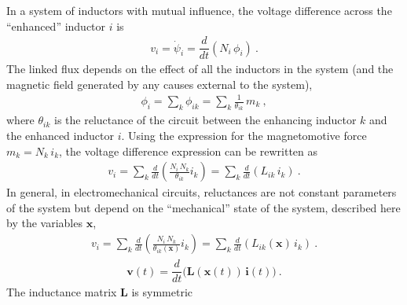 \documentclass[letterpaper,10pt,english]{jupyterBook}
\begin{document}
\sphinxAtStartPar
In a system of inductors with mutual influence, the voltage difference across the “enhanced” inductor \(i\) is
\begin{equation*}
\begin{split}v_i = \dot{\psi}_i = \dfrac{d}{dt} \left( N_i \, \phi_i \right) \ .\end{split}
\end{equation*}
\sphinxAtStartPar
The linked flux depends on the effect of all the inductors in the system (and the magnetic field generated by any causes external to the system),
\begin{equation*}
\begin{split}\phi_i = \sum_{k} \phi_{ik} = \sum_{k} \frac{1}{\theta_{ik}} \, m_k \ ,\end{split}
\end{equation*}
\sphinxAtStartPar
where \(\theta_{ik}\) is the reluctance of the circuit between the enhancing inductor \(k\) and the enhanced inductor \(i\). Using the expression for the magnetomotive force \(m_k = N_k \, i_k\), the voltage difference expression can be rewritten as
\begin{equation*}
\begin{split}v_i = \sum_k \frac{d}{dt} \left( \frac{N_i \, N_k}{\theta_{ik}} i_k \right) = \sum_k \frac{d}{dt} \left( L_{ik} \, i_k \right) \ .\end{split}
\end{equation*}
\sphinxAtStartPar
In general, in electromechanical circuits, reluctances are not constant parameters of the system but depend on the “mechanical” state of the system, described here by the variables \(\mathbf{x}\),
\begin{equation*}
\begin{split}v_i = \sum_k \frac{d}{dt} \left( \frac{N_i \, N_k}{\theta_{ik}(\mathbf{x})} i_k \right) = \sum_k \frac{d}{dt} \left( L_{ik} (\mathbf{x}) \, i_k \right) \ .\end{split}
\end{equation*}\begin{equation*}
\begin{split}\mathbf{v}(t) = \dfrac{d}{dt} \Big( \mathbf{L}(\mathbf{x}(t)) \, \mathbf{i}(t) \Big) \ .\end{split}
\end{equation*}
\sphinxAtStartPar
The inductance matrix \(\mathbf{L}\) is symmetric  
\label{ch/circuits-electromechanic-old:example-0}
\end{document}
